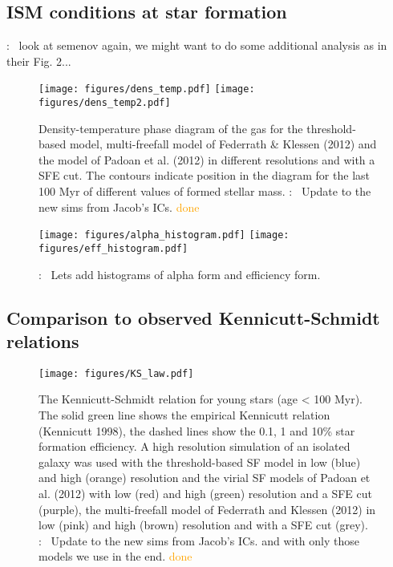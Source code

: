 \documentclass{aa}
\newcommand{\T}[1]{{\color{blue}{\bf T}:~ #1}}
\begin{document}
\subsection{ISM conditions at star formation}

\T{look at semenov again, we might want to do some additional analysis as in their Fig. 2...}

\begin{figure*}
\begin{center}
    \texttt{[image: figures/dens\_temp.pdf]}
    \texttt{[image: figures/dens\_temp2.pdf]}
    \caption{Density-temperature phase diagram of the gas for the threshold-based model, multi-freefall model of Federrath \& Klessen (2012) and the model of Padoan et al. (2012) in different resolutions and with a SFE cut. The contours indicate position in the diagram for the last 100 Myr of different values of formed stellar mass. \T{Update to the new sims from Jacob's ICs.} \textcolor{orange}{done}}
\end{center}
\end{figure*}

\begin{figure*}
\begin{center}
    \texttt{[image: figures/alpha\_histogram.pdf]}
    \texttt{[image: figures/eff\_histogram.pdf]}
    \caption{ \T{Lets add histograms of alpha form and efficiency form.} }
\end{center}
\end{figure*}

\subsection{Comparison to observed Kennicutt-Schmidt relations}

\begin{figure}
\begin{center}
    \texttt{[image: figures/KS\_law.pdf]}
    \caption{The Kennicutt-Schmidt relation for young stars (age < 100 Myr). The solid green line shows the empirical Kennicutt relation (Kennicutt 1998), the dashed lines show the 0.1, 1 and 10\% star formation efficiency. A high resolution simulation of an isolated galaxy was used with the threshold-based SF model in low (blue) and high (orange) resolution and the virial SF models of Padoan et al. (2012) with low (red) and high (green) resolution and a SFE cut (purple), the multi-freefall model of Federrath and Klessen (2012) in low (pink) and high (brown) resolution and with a SFE cut (grey). \T{Update to the new sims from Jacob's ICs. and with only those models we use in the end.} \textcolor{orange}{done}}
\end{center}
\end{figure}
\end{document}
